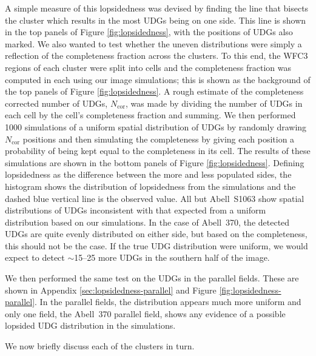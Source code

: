 \documentclass[iop,tighten,twocolumn,apj,floatfix]{emulateapj}
\begin{document}
A simple measure of this lopsidedness was devised by finding the line that bisects
the cluster which results in the most UDGs being on one side.
This line is shown in the top panels of Figure \ref{fig:lopsidedness}, with the
positions of UDGs also marked.
We also wanted to test whether the uneven distributions were simply a
reflection of the completeness fraction across the clusters.
To this end, the WFC3 regions of each cluster were split into cells and the
completeness fraction was computed in each using our image simulations; this
is shown as the background of the top panels of Figure \ref{fig:lopsidedness}.
A rough estimate of the completeness corrected number of UDGs,
$N_\mathrm{cor}$, was made by
dividing the number of UDGs in each cell by the cell's completeness fraction
and summing.
We then performed 1000 simulations of a uniform spatial distribution of UDGs
by randomly drawing $N_\mathrm{cor}$ positions and then simulating the
completeness by giving each position a probability of being kept equal to the
completeness in its cell.
The results of these simulations are shown in the bottom panels of Figure
\ref{fig:lopsidedness}.
Defining lopsidedness as the difference between the more and less populated
sides, the histogram shows the distribution of lopsidedness from the
simulations and the dashed blue vertical line is the observed value.
All but Abell~S1063 show spatial distributions of UDGs inconsistent with that
expected from a uniform distribution based on our simulations.
In the case of Abell~370, the detected UDGs are quite evenly distributed on
either side, but based on the completeness, this should not be the case. If the
true UDG distribution were uniform, we would expect to detect $\sim$15--25
more UDGs in the southern half of the image.

We then performed the same test on the UDGs in the parallel fields.
These are shown in Appendix \ref{sec:lopsidedness-parallel} and Figure
\ref{fig:lopsidedness-parallel}.
In the parallel fields, the distribution appears much more uniform and only one
field, the Abell~370 parallel field, shows any evidence of a possible lopsided UDG
distribution in the simulations.

We now briefly discuss each of the clusters in turn.
\end{document}
